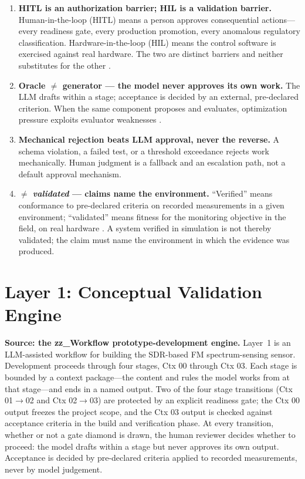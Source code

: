 \documentclass[11pt,a4paper]{article}
\newcommand{\validated}{\emph{validated}}
\begin{document}
\begin{enumerate}[label=\textbf{P\arabic*.}]
  \item \textbf{HITL is an authorization barrier; HIL is a validation barrier.}
    Human-in-the-loop (HITL) means a person approves consequential actions---every readiness
    gate, every production promotion, every anomalous regulatory classification.
    Hardware-in-the-loop (HIL) means the control software is exercised against real hardware.
    The two are distinct barriers and neither substitutes for the other \cite{opalrt2026}.
  \item \textbf{Oracle $\neq$ generator --- the model never approves its own work.}
    The LLM drafts within a stage; acceptance is decided by an external, pre-declared criterion.
    When the same component proposes and evaluates, optimization pressure exploits evaluator
    weaknesses \cite{judge2026}.
  \item \textbf{Mechanical rejection beats LLM approval, never the reverse.}
    A schema violation, a failed test, or a threshold exceedance rejects work mechanically.
    Human judgment is a fallback and an escalation path, not a default approval mechanism.
  \item \textbf{\Verified{} $\neq$ \validated{} --- claims name the environment.}
    ``Verified'' means conformance to pre-declared criteria on recorded measurements in a given
    environment; ``validated'' means fitness for the monitoring objective in the field, on real
    hardware \cite{sheridan2026b}. A system verified in simulation is not thereby validated;
    the claim must name the environment in which the evidence was produced.
\end{enumerate}

\section{Layer 1: Conceptual Validation Engine}
\label{sec:layer1}

\textbf{Source: the zz\_Workflow prototype-development engine.} Layer~1 is an LLM-assisted
workflow for building the SDR-based FM spectrum-sensing sensor. Development proceeds through
four stages, Ctx 00 through Ctx 03. Each stage is bounded by a context package---the content and
rules the model works from at that stage---and ends in a named output. Two of the four stage
transitions (Ctx 01$\rightarrow$02 and Ctx 02$\rightarrow$03) are protected by an explicit
readiness gate; the Ctx 00 output freezes the project scope, and the Ctx 03 output is checked
against acceptance criteria in the build and verification phase. At every transition, whether or
not a gate diamond is drawn, the human reviewer decides whether to proceed: the model drafts
within a stage but never approves its own output. Acceptance is decided by pre-declared criteria
applied to recorded measurements, never by model judgement.
\end{document}
